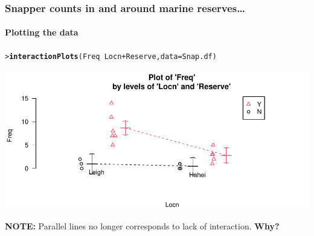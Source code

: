 \documentclass{beamer}\usepackage[]{graphicx}\usepackage[]{xcolor}
\makeatletter
\def\maxwidth{ %
  \ifdim\Gin@nat@width>\linewidth
    \linewidth
  \else
    \Gin@nat@width
  \fi
}
\newcommand{\hlopt}[1]{\textcolor[rgb]{0,0,0}{#1}}%
\newcommand{\hlstd}[1]{\textcolor[rgb]{0.345,0.345,0.345}{#1}}%
\newcommand{\hlkwc}[1]{\textcolor[rgb]{0.333,0.667,0.333}{#1}}%
\newcommand{\hlkwd}[1]{\textcolor[rgb]{0.737,0.353,0.396}{\textbf{#1}}}%
\newenvironment{kframe}{%
 \def\at@end@of@kframe{}%
 \ifinner\ifhmode%
  \def\at@end@of@kframe{\end{minipage}}%
  \begin{minipage}{\columnwidth}%
 \fi\fi%
 \def\FrameCommand##1{\hskip\@totalleftmargin \hskip-\fboxsep
 \colorbox{shadecolor}{##1}\hskip-\fboxsep
     \hskip-\linewidth \hskip-\@totalleftmargin \hskip\columnwidth}%
 \MakeFramed {\advance\hsize-\width
   \@totalleftmargin\z@ \linewidth\hsize
   \@setminipage}}%
 {\par\unskip\endMakeFramed%
 \at@end@of@kframe}
\newenvironment{knitrout}{}{} %
\makeatother
\begin{document}
\begin{frame}[fragile]
\frametitle{Snapper counts in and around marine reserves\ldots}
\framesubtitle{Plotting the data}

\begin{knitrout}\scriptsize
{}\color{fgcolor}\begin{kframe}
\begin{alltt}
\hlstd{> }\hlkwd{interactionPlots}\hlstd{(Freq} \hlopt{~} \hlstd{Locn} \hlopt{+} \hlstd{Reserve,} \hlkwc{data} \hlstd{= Snap.df)}
\end{alltt}
\end{kframe}
\end{knitrout}

\begin{knitrout}\scriptsize
{}\color{fgcolor}
\includegraphics[width=\maxwidth]{figure/RC-H14-015-1} 
\end{knitrout}

{\bf NOTE:} Parallel lines no longer corresponds to lack of interaction.
{\bf Why?}
\end{frame}
\end{document}
